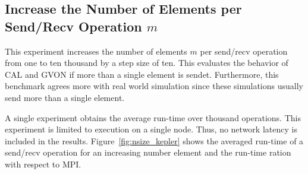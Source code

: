 \subsection*{Increase the Number of Elements per Send/Recv Operation $m$}
This experiment increases the number of elements $m$ per send/recv
operation from one to ten thousand by a step size of ten. This
evaluates the behavior of CAL and GVON if more than a single element
is sendet. Furthermore, this benchmark agrees more with real world
simulation since these simulations usually send more than a single
element.

A single experiment obtains the average run-time over thousand
operations.  This experiment is limited to execution on a single
node. Thus, no network latency is included in the
results. Figure~\ref{fig:nsize_kepler} shows the averaged run-time of
a send/recv operation for an increasing number element and the
run-time ration with respect to MPI.

